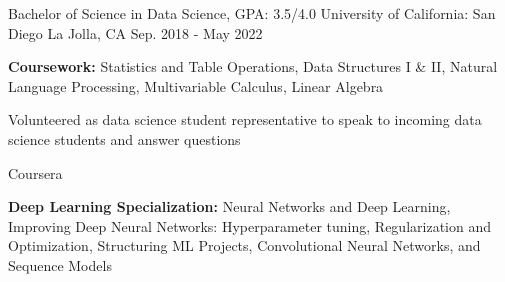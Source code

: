 
\begin{cventries}
  \cventry
    {Bachelor of Science in Data Science, GPA: 3.5/4.0} %
    {University of California: San Diego} %
    {La Jolla, CA} %
    {Sep. 2018 - May 2022} %
    {
      \begin{cvitems} %
         \item {\textbf{Coursework:} {Statistics and Table Operations, Data Structures I \& II, Natural Language Processing, Multivariable Calculus, Linear Algebra}}
         \item{Volunteered as data science student representative to speak to incoming data science students and answer questions}
      \end{cvitems}
    }
  \cventry
    {} %
    {Coursera} %
    {} %
    {} %
    {
      \begin{cvitems} %
         \item {\textbf{Deep Learning Specialization:} {Neural Networks and Deep Learning, Improving Deep Neural Networks: Hyperparameter tuning, Regularization and Optimization, Structuring ML Projects, Convolutional Neural Networks, and Sequence Models}}
      \end{cvitems}
    }
\end{cventries}
